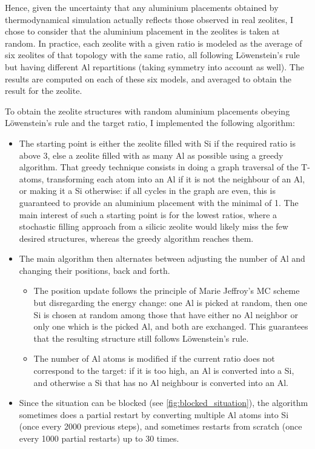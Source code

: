 \documentclass[main.tex]{subfiles}
\begin{document}
Hence, given the uncertainty that any aluminium placements obtained by thermodynamical simulation actually reflects those observed in real zeolites, I chose to consider that the aluminium placement in the zeolites is taken at random. In practice, each zeolite with a given \SiAl ratio is modeled as the average of six zeolites of that topology with the same \SiAl ratio, all following L\"owenstein's rule but having different Al repartitions (taking symmetry into account as well). The results are computed on each of these six models, and averaged to obtain the result for the zeolite.

To obtain the zeolite structures with random aluminium placements obeying L\"owenstein's rule and the target \SiAl ratio, I implemented the following algorithm:
\begin{itemize}
    \item The starting point is either the zeolite filled with Si if the required \SiAl ratio is above 3, else a zeolite filled with as many Al as possible using a greedy algorithm. That greedy technique consists in doing a graph traversal of the T-atoms, transforming each atom into an Al if it is not the neighbour of an Al, or making it a Si otherwise: if all cycles in the graph are even, this is guaranteed to provide an aluminium placement with the minimal \SiAl of 1.
    The main interest of such a starting point is for the lowest \SiAl ratios, where a stochastic filling approach from a silicic zeolite would likely miss the few desired structures, whereas the greedy algorithm reaches them.
    \item The main algorithm then alternates between adjusting the number of Al and changing their positions, back and forth.
    \begin{itemize}
        \item The position update follows the principle of Marie Jeffroy's MC scheme but disregarding the energy change: one Al is picked at random, then one Si is chosen at random among those that have either no Al neighbor or only one which is the picked Al, and both are exchanged. This guarantees that the resulting structure still follows L\"owenstein's rule.
        \item The number of Al atoms is modified if the current \SiAl ratio does not correspond to the target: if it is too high, an Al is converted into a Si, and otherwise a Si that has no Al neighbour is converted into an Al.
    \end{itemize}
    \item Since the situation can be blocked (see \cref{fig:blocked_situation}), the algorithm sometimes does a partial restart by converting multiple Al atoms into Si (once every \num{2000} previous steps), and sometimes restarts from scratch (once every \num{1000} partial restarts) up to \num{30} times.

\end{itemize}
\end{document}
